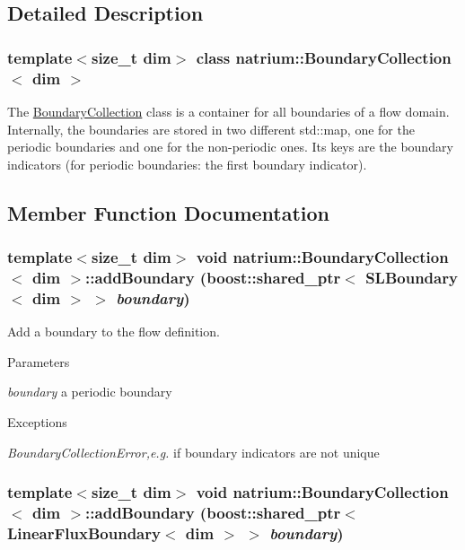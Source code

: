 \subsection{Detailed Description}
\subsubsection*{template$<$size\_\-t dim$>$ class natrium::BoundaryCollection$<$ dim $>$}

The \hyperlink{classnatrium_1_1BoundaryCollection}{BoundaryCollection} class is a container for all boundaries of a flow domain. Internally, the boundaries are stored in two different std::map, one for the periodic boundaries and one for the non-\/periodic ones. Its keys are the boundary indicators (for periodic boundaries: the first boundary indicator). 

\subsection{Member Function Documentation}
\hypertarget{classnatrium_1_1BoundaryCollection_a7eb369274f50a3e671cd8cd98e1cff68}{
\subsubsection[{addBoundary}]{\setlength{\rightskip}{0pt plus 5cm}template$<$size\_\-t dim$>$ void {\bf natrium::BoundaryCollection}$<$ dim $>$::addBoundary (boost::shared\_\-ptr$<$ {\bf SLBoundary}$<$ dim $>$ $>$ {\em boundary})}}
\label{classnatrium_1_1BoundaryCollection_a7eb369274f50a3e671cd8cd98e1cff68}


Add a boundary to the flow definition. 
\begin{DoxyParams}{Parameters}
\item[{\em boundary}]a periodic boundary \end{DoxyParams}

\begin{DoxyExceptions}{Exceptions}
\item[{\em BoundaryCollectionError,e.g.}]if boundary indicators are not unique \end{DoxyExceptions}
\hypertarget{classnatrium_1_1BoundaryCollection_aa248c47170036538ef052940123b2322}{
\subsubsection[{addBoundary}]{\setlength{\rightskip}{0pt plus 5cm}template$<$size\_\-t dim$>$ void {\bf natrium::BoundaryCollection}$<$ dim $>$::addBoundary (boost::shared\_\-ptr$<$ {\bf LinearFluxBoundary}$<$ dim $>$ $>$ {\em boundary})}}
\label{classnatrium_1_1BoundaryCollection_aa248c47170036538ef052940123b2322}


